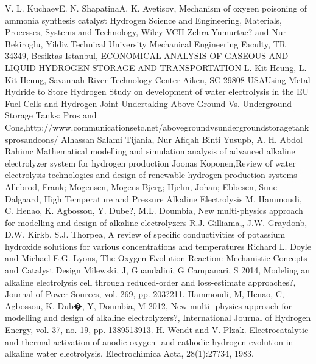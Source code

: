 \singlespacing
\begin{thebibliography}{99}
\linespread{1} 
V. L. KuchaevE. N. ShapatinaA. K. Avetisov, Mechanism of oxygen poisoning of ammonia synthesis catalyst
Hydrogen Science and Engineering, Materials, Processes, Systems and Technology, Wiley-VCH
Zehra Yumurtac? and Nur Bekiroglu, Yildiz Technical University Mechanical Engineering Faculty, TR 34349, Besiktas Istanbul, ECONOMICAL ANALYSIS OF GASEOUS AND LIQUID HYDROGEN STORAGE AND TRANSPORTATION
L. Kit Heung, L. Kit Heung, Savannah River Technology Center Aiken, SC 29808 USAUsing Metal Hydride to Store Hydrogen
Study on development of water electrolysis in the EU Fuel Cells and Hydrogen Joint Undertaking
Above Ground Vs. Underground Storage Tanks: Pros and Cons,http://www.communicationsetc.net/above\-ground\-vs\-underground\-storage\-tanks\-pros\-and\-cons/
Alhassan Salami Tijania, Nur Afiqah Binti Yusupb, A. H. Abdol Rahimc
Mathematical modelling and simulation analysis of advanced alkaline electrolyzer system for hydrogen production
Joonas Koponen,Review of water electrolysis technologies and design of renewable hydrogen production systems
Allebrod, Frank; Mogensen, Mogens Bjerg; Hjelm, Johan; Ebbesen, Sune Dalgaard, High Temperature and Pressure Alkaline Electrolysis
M. Hammoudi, C. Henao, K. Agbossou, Y. Dube?, M.L. Doumbia, New multi-physics approach for modelling and design of alkaline electrolyzers
R.J. Gilliama,, J.W. Graydonb, D.W. Kirkb, S.J. Thorpea, A review of specific conductivities of potassium hydroxide solutions for various concentrations and temperatures
Richard L. Doyle and Michael E.G. Lyons, The Oxygen Evolution Reaction: Mechanistic Concepts and Catalyst Design
Milewski, J, Guandalini, G  Campanari, S 2014, Modeling an alkaline electrolysis cell through reduced-order and loss-estimate approaches?, Journal of Power Sources, vol. 269, pp. 203?211.
Hammoudi, M, Henao, C, Agbossou, K, Dub�, Y, Doumbia, M 2012, New multi- physics approach for modelling and design of alkaline electrolyzers?, International Journal of Hydrogen Energy, vol. 37, no. 19, pp. 1389513913.
H. Wendt and V. Plzak. Electrocatalytic and thermal activation of anodic oxygen- and cathodic hydrogen-evolution in alkaline water electrolysis. Electrochimica Acta, 28(1):27?34, 1983.

\end{thebibliography}
